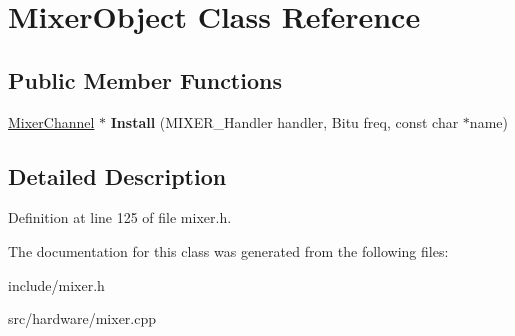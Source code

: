 \hypertarget{classMixerObject}{\section{Mixer\-Object Class Reference}
\label{classMixerObject}
}
\subsection*{Public Member Functions}
\begin{DoxyCompactItemize}
\item 
\hypertarget{classMixerObject_a69627e7e471b0afbc613a8d2b2b9221c}{\hyperlink{classMixerChannel}{Mixer\-Channel} $\ast$ {\bfseries Install} (M\-I\-X\-E\-R\-\_\-\-Handler handler, Bitu freq, const char $\ast$name)}\label{classMixerObject_a69627e7e471b0afbc613a8d2b2b9221c}

\end{DoxyCompactItemize}


\subsection{Detailed Description}


Definition at line 125 of file mixer.\-h.



The documentation for this class was generated from the following files\-:\begin{DoxyCompactItemize}
\item 
include/mixer.\-h\item 
src/hardware/mixer.\-cpp\end{DoxyCompactItemize}
